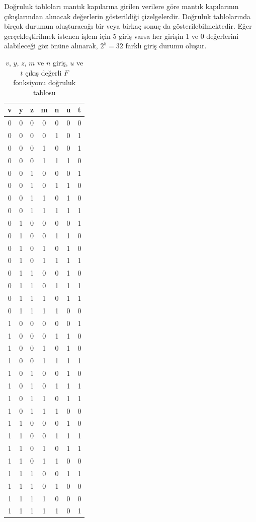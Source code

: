 Doğruluk tabloları mantık kapılarına girilen verilere göre mantık kapılarının çıkışlarından alınacak değerlerin gösterildiği çizelgelerdir. Doğruluk tablolarında birçok durumun oluşturacağı bir veya birkaç sonuç da gösterilebilmektedir. Eğer gerçekleştirilmek istenen işlem için 5 giriş varsa her girişin 1 ve 0 değerlerini alabileceği göz önüne alınarak, $2^5 = 32$ farklı giriş durumu oluşur.

\begin{table}[H]
\centering
\caption{$v$, $y$, $z$, $m$ ve $n$ giriş, $u$ ve $t$ çıkış değerli $F$ fonksiyonu doğruluk tablosu}
\label{tab:B.1}
\begin{tabular}{ccccc|cc}
\toprule
\textbf{v} & \textbf{y} & \textbf{z} & \textbf{m} & \textbf{n} & \textbf{u} & \textbf{t} \\
\midrule
0 & 0 & 0 & 0 & 0 & 0 & 0 \\
0 & 0 & 0 & 0 & 1 & 0 & 1 \\
0 & 0 & 0 & 1 & 0 & 0 & 1 \\
0 & 0 & 0 & 1 & 1 & 1 & 0 \\
0 & 0 & 1 & 0 & 0 & 0 & 1 \\
0 & 0 & 1 & 0 & 1 & 1 & 0 \\
0 & 0 & 1 & 1 & 0 & 1 & 0 \\
0 & 0 & 1 & 1 & 1 & 1 & 1 \\
0 & 1 & 0 & 0 & 0 & 0 & 1 \\
0 & 1 & 0 & 0 & 1 & 1 & 0 \\
0 & 1 & 0 & 1 & 0 & 1 & 0 \\
0 & 1 & 0 & 1 & 1 & 1 & 1 \\
0 & 1 & 1 & 0 & 0 & 1 & 0 \\
0 & 1 & 1 & 0 & 1 & 1 & 1 \\
0 & 1 & 1 & 1 & 0 & 1 & 1 \\
0 & 1 & 1 & 1 & 1 & 0 & 0 \\
1 & 0 & 0 & 0 & 0 & 0 & 1 \\
1 & 0 & 0 & 0 & 1 & 1 & 0 \\
1 & 0 & 0 & 1 & 0 & 1 & 0 \\
1 & 0 & 0 & 1 & 1 & 1 & 1 \\
1 & 0 & 1 & 0 & 0 & 1 & 0 \\
1 & 0 & 1 & 0 & 1 & 1 & 1 \\
1 & 0 & 1 & 1 & 0 & 1 & 1 \\
1 & 0 & 1 & 1 & 1 & 0 & 0 \\
1 & 1 & 0 & 0 & 0 & 1 & 0 \\
1 & 1 & 0 & 0 & 1 & 1 & 1 \\
1 & 1 & 0 & 1 & 0 & 1 & 1 \\
1 & 1 & 0 & 1 & 1 & 0 & 0 \\
1 & 1 & 1 & 0 & 0 & 1 & 1 \\
1 & 1 & 1 & 0 & 1 & 0 & 0 \\
1 & 1 & 1 & 1 & 0 & 0 & 0 \\
1 & 1 & 1 & 1 & 1 & 0 & 1 \\
\bottomrule
\end{tabular}
\end{table}


